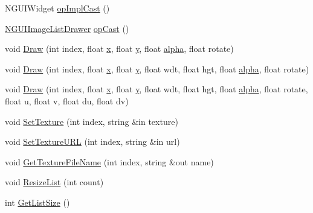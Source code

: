 \begin{DoxyCompactItemize}
\item 
N\+G\+U\+I\+Widget \hyperlink{class_n_g_u_i_image_list_drawer_a792e61b468f61db72b1535e2feb4c2a2}{op\+Impl\+Cast} ()
\item 
\hyperlink{class_n_g_u_i_image_list_drawer}{N\+G\+U\+I\+Image\+List\+Drawer} \hyperlink{class_n_g_u_i_image_list_drawer_a827f0eb20fd019e6804b052538172275}{op\+Cast} ()
\item 
void \hyperlink{class_n_g_u_i_image_list_drawer_acc40e371bb6cbfc91c35d326102ac836}{Draw} (int index, float \hyperlink{class_n_g_u_i_image_list_drawer_ad2f7eec73b1abc42b6110412323cae42}{x}, float \hyperlink{class_n_g_u_i_image_list_drawer_a041b9ed5f7b0700ae85f3cce73548f46}{y}, float \hyperlink{class_n_g_u_i_image_list_drawer_a12b8fae75eac21c660c9553440a26ba1}{alpha}, float rotate)
\item 
void \hyperlink{class_n_g_u_i_image_list_drawer_ab7405aa338242a16a809ed5df1f0afba}{Draw} (int index, float \hyperlink{class_n_g_u_i_image_list_drawer_ad2f7eec73b1abc42b6110412323cae42}{x}, float \hyperlink{class_n_g_u_i_image_list_drawer_a041b9ed5f7b0700ae85f3cce73548f46}{y}, float wdt, float hgt, float \hyperlink{class_n_g_u_i_image_list_drawer_a12b8fae75eac21c660c9553440a26ba1}{alpha}, float rotate)
\item 
void \hyperlink{class_n_g_u_i_image_list_drawer_a1c86c9268747df86f4ffe6c071b1bdd6}{Draw} (int index, float \hyperlink{class_n_g_u_i_image_list_drawer_ad2f7eec73b1abc42b6110412323cae42}{x}, float \hyperlink{class_n_g_u_i_image_list_drawer_a041b9ed5f7b0700ae85f3cce73548f46}{y}, float wdt, float hgt, float \hyperlink{class_n_g_u_i_image_list_drawer_a12b8fae75eac21c660c9553440a26ba1}{alpha}, float rotate, float u, float v, float du, float dv)
\item 
void \hyperlink{class_n_g_u_i_image_list_drawer_aef3eb4ace9c916fddcc061836b43f277}{Set\+Texture} (int index, string \&in texture)
\item 
void \hyperlink{class_n_g_u_i_image_list_drawer_a2b1a64bb9fe1794cce4bdcb42d6a4369}{Set\+Texture\+U\+RL} (int index, string \&in url)
\item 
void \hyperlink{class_n_g_u_i_image_list_drawer_a17eb90953e7961afc889e34790293a3c}{Get\+Texture\+File\+Name} (int index, string \&out name)
\item 
void \hyperlink{class_n_g_u_i_image_list_drawer_a91bbfd8b82d30f5f9a62a8cb79c6522b}{Resize\+List} (int count)
\item 
int \hyperlink{class_n_g_u_i_image_list_drawer_ac450be52a79c4277a03f2f0b9dfa3e60}{Get\+List\+Size} ()
\item 

\end{DoxyCompactItemize}
